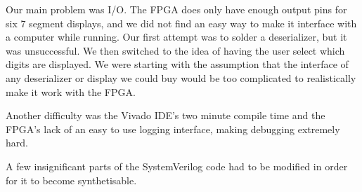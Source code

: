 \documentclass{scrartcl}
\begin{document}
Our main problem was I/O. The FPGA does only have enough output pins for six 7 segment displays, and we did not find an easy way to make it interface with a computer while running.
Our first attempt was to solder a deserializer, but it was unsuccessful.
We then switched to the idea of having the user select which digits are displayed.
We were starting with the assumption that the interface of any deserializer or display we could buy would be too complicated to realistically make it work with the FPGA.

Another difficulty was the Vivado IDE's two minute compile time and the FPGA's lack of an easy to use logging interface, making debugging extremely hard.

A few insignificant parts of the SystemVerilog code had to be modified in order for it to become synthetisable.
\end{document}
